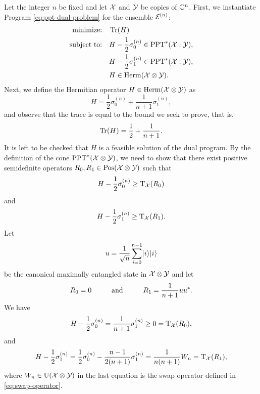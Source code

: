 Let the integer $n$ be fixed and let $\mathcal{X}$ and $\mathcal{Y}$ be copies of $\mathbb{C}^{n}$.
First, we instantiate Program \eqref{eq:ppt-dual-problem} for the ensemble $\mathcal{E}^{(n)}$:
\begin{equation}
  \label{eq:ppt-dual-problem-werner}
  \begin{split}
    \text{minimize:} \quad & \operatorname{Tr}(H)\\
    \text{subject to:} 
      \quad & H - \frac{1}{2}\sigma_0^{(n)} \in \mathrm{PPT}^{\ast}(\mathcal{X}:\mathcal{Y}),\\
      \quad & H - \frac{1}{2}\sigma_1^{(n)} \in \mathrm{PPT}^{\ast}(\mathcal{X}:\mathcal{Y}),\\
      \quad & H \in \mathrm{Herm}(\mathcal{X}\otimes\mathcal{Y}).\\
  \end{split}
\end{equation}
Next, we define the Hermitian operator $H \in \mathrm{Herm}(\mathcal{X}\otimes\mathcal{Y})$ as 
\begin{equation}
\label{eq:H-werner}
  H = \frac{1}{2}\sigma_{0}^{(n)} + \frac{1}{n+1}\sigma_{1}^{(n)},
\end{equation}
and observe that the trace is equal to the bound we seek to prove, that is,
\begin{equation}
  \operatorname{Tr}(H) = \frac{1}{2} + \frac{1}{n+1}.
\end{equation}
It is left to be checked that $H$ is a feasible solution of the dual program.
By the definition of the cone $\mathrm{PPT}^{\ast}(\mathcal{X}\otimes\mathcal{Y})$, 
we need to show that there exist positive semidefinite operators 
$R_{0}, R_{1} \in \mathrm{Pos}(\mathcal{X}\otimes\mathcal{Y})$ such that
\begin{equation}
H - \frac{1}{2}\sigma_0^{(n)} \geq \operatorname{T}_{\mathcal{X}}(R_{0})
\end{equation}
and 
\begin{equation}
H - \frac{1}{2}\sigma_1^{(n)} \geq \operatorname{T}_{\mathcal{X}}(R_{1}).
\end{equation}
Let 
\begin{equation}
u = \frac{1}{\sqrt{n}}\sum_{i=0}^{n-1}\lvert\mspace{0.5mu} i \mspace{0.5mu} \rangle\lvert\mspace{0.5mu} i \mspace{0.5mu} \rangle
\end{equation}
be the canonical maximally entangled state in $\mathcal{X}\otimes\mathcal{Y}$ and let 
\begin{equation}
  R_{0} = 0
    \hspace*{1cm}\mbox{and}\hspace*{1cm}
  R_{1} = \frac{1}{n+1}uu^{\ast}.
\end{equation}
We have
\begin{equation}
  H - \frac{1}{2}\sigma_{0}^{(n)} = \frac{1}{n+1}\sigma_{1}^{(n)} \geq 0 = \operatorname{T}_{\mathcal{X}}(R_{0}),
\end{equation}
and
\begin{equation}
    H - \frac{1}{2}\sigma_{1}^{(n)} = \frac{1}{2}\sigma_{0}^{(n)} - 
      \frac{n-1}{2(n+1)}\sigma_{1}^{(n)} = \frac{1}{n(n+1)}W_{n} = \operatorname{T}_{\mathcal{X}}(R_{1}), 
\end{equation}
where $W_{n}\in\mathrm{U}(\mathcal{X}\otimes\mathcal{Y})$ in the last equation is the swap operator 
defined in \eqref{eq:swap-operator}. 

